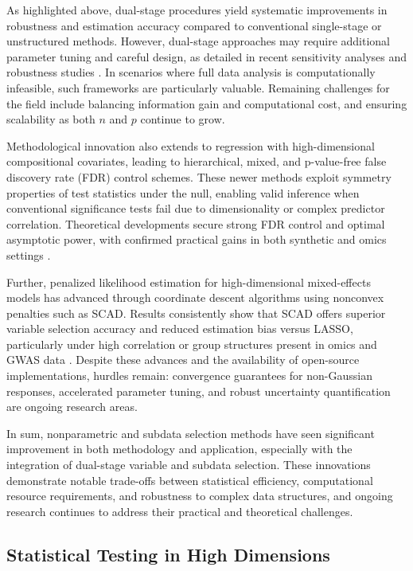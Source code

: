 \documentclass[sigconf]{acmart}
\begin{document}
As highlighted above, dual-stage procedures yield systematic improvements in robustness and estimation accuracy compared to conventional single-stage or unstructured methods. However, dual-stage approaches may require additional parameter tuning and careful design, as detailed in recent sensitivity analyses and robustness studies \cite{ref102}. In scenarios where full data analysis is computationally infeasible, such frameworks are particularly valuable. Remaining challenges for the field include balancing information gain and computational cost, and ensuring scalability as both $n$ and $p$ continue to grow.

Methodological innovation also extends to regression with high-dimensional compositional covariates, leading to hierarchical, mixed, and p-value-free false discovery rate (FDR) control schemes. These newer methods exploit symmetry properties of test statistics under the null, enabling valid inference when conventional significance tests fail due to dimensionality or complex predictor correlation. Theoretical developments secure strong FDR control and optimal asymptotic power, with confirmed practical gains in both synthetic and omics settings \cite{ref102}.

Further, penalized likelihood estimation for high-dimensional mixed-effects models has advanced through coordinate descent algorithms using nonconvex penalties such as SCAD. Results consistently show that SCAD offers superior variable selection accuracy and reduced estimation bias versus LASSO, particularly under high correlation or group structures present in omics and GWAS data \cite{ref100}. Despite these advances and the availability of open-source implementations, hurdles remain: convergence guarantees for non-Gaussian responses, accelerated parameter tuning, and robust uncertainty quantification are ongoing research areas.

In sum, nonparametric and subdata selection methods have seen significant improvement in both methodology and application, especially with the integration of dual-stage variable and subdata selection. These innovations demonstrate notable trade-offs between statistical efficiency, computational resource requirements, and robustness to complex data structures, and ongoing research continues to address their practical and theoretical challenges.

\subsection{Statistical Testing in High Dimensions}
\end{document}
